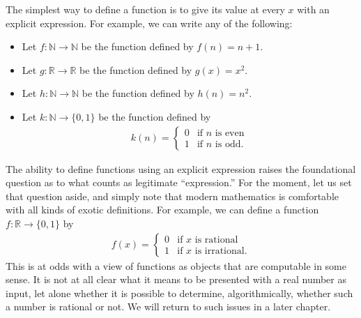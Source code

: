 \documentclass[letterpaper,10pt,english]{sphinxmanual}
\begin{document}
\sphinxAtStartPar
The simplest way to define a function is to give its value at every \(x\) with an explicit expression. For example, we can write any of the following:
\begin{itemize}
\item {} 
\sphinxAtStartPar
Let \(f : \mathbb{N} \to \mathbb{N}\) be the function defined by \(f(n) = n + 1\).

\item {} 
\sphinxAtStartPar
Let \(g : \mathbb{R} \to \mathbb{R}\) be the function defined by \(g(x) = x^2\).

\item {} 
\sphinxAtStartPar
Let \(h : \mathbb{N} \to \mathbb{N}\) be the function defined by \(h(n) = n^2\).

\item {} 
\sphinxAtStartPar
Let \(k : \mathbb{N} \to \{0, 1\}\) be the function defined by
\begin{equation*}
\begin{split}k(n) =
  \left\{\begin{array}{ll}
    0 & \mbox{if $n$ is even} \\
    1 & \mbox{if $n$ is odd.}
  \end{array}\right.\end{split}
\end{equation*}
\end{itemize}

\sphinxAtStartPar
The ability to define functions using an explicit expression raises the foundational question as to what counts as legitimate “expression.” For the moment, let us set that question aside, and simply note that modern mathematics is comfortable with all kinds of exotic definitions. For example, we can define a function \(f : \mathbb{R} \to \{0, 1\}\) by
\begin{equation*}
\begin{split}f(x) =
  \left\{\begin{array}{ll}
    0 & \mbox{if $x$ is rational} \\
    1 & \mbox{if $x$ is irrational.}
  \end{array}\right.\end{split}
\end{equation*}
\sphinxAtStartPar
This is at odds with a view of functions as objects that are computable in some sense. It is not at all clear what it means to be presented with a real number as input, let alone whether it is possible to determine, algorithmically, whether such a number is rational or not. We will return to such issues in a later chapter.
\end{document}
